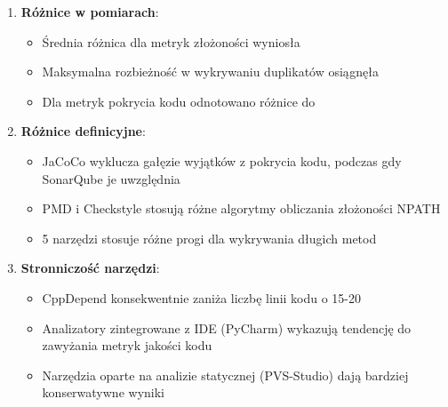 \documentclass[a4paper,12pt]{article}
\begin{document}
\begin{enumerate}
\item \textbf{Różnice w pomiarach}:
\begin{itemize}
\item Średnia różnica dla metryk złożoności wyniosła %
\item Maksymalna rozbieżność w wykrywaniu duplikatów osiągnęła %
\item Dla metryk pokrycia kodu odnotowano różnice do %
\end{itemize}

\item \textbf{Różnice definicyjne}:
\begin{itemize}
\item JaCoCo wyklucza gałęzie wyjątków z pokrycia kodu, podczas gdy SonarQube je uwzględnia
\item PMD i Checkstyle stosują różne algorytmy obliczania złożoności NPATH
\item 5 narzędzi stosuje różne progi dla wykrywania długich metod
\end{itemize}

\item \textbf{Stronniczość narzędzi}:
\begin{itemize}
\item CppDepend konsekwentnie zaniża liczbę linii kodu o 15-20%
\item Analizatory zintegrowane z IDE (PyCharm) wykazują tendencję do zawyżania metryk jakości kodu
\item Narzędzia oparte na analizie statycznej (PVS-Studio) dają bardziej konserwatywne wyniki
\end{itemize}
\end{enumerate}
\end{document}
